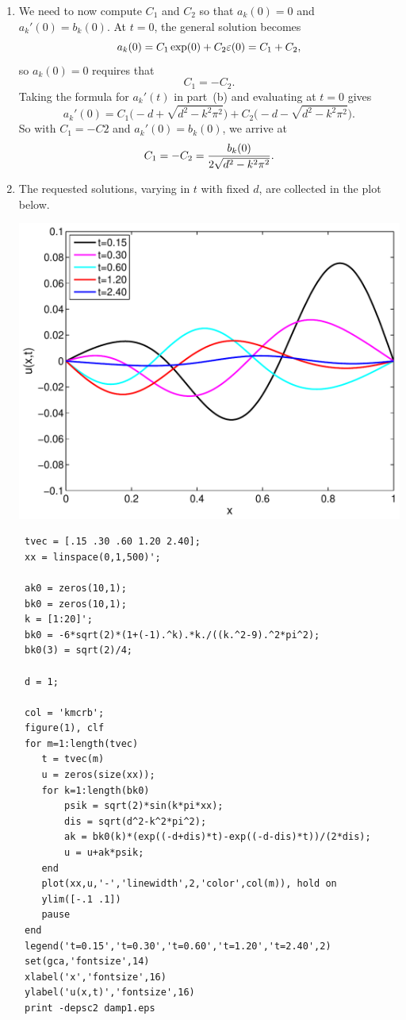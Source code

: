 \begin{solution}
\begin{enumerate}
\item We need to now compute $C_1$ and $C_2$ so that $a_k(0)=0$ and $a_k'(0)=b_k(0)$.
      At $t=0$, the general solution becomes
      \[ a_k(0) = C_1 \exp(0) + C_2 \varepsilon(0) = C_1 + C_2,\]
      so $a_k(0) = 0$ requires that 
           \[ C_1 = -C_2. \]
      Taking the formula for $a_k'(t)$ in part~(b) and evaluating at $t=0$ gives
      \[ a_k'(0) = C_1 \big(-d + \sqrt{d^2 -k^2\pi^2}\big)
                    + C_2 \big(-d - \sqrt{d^2 -k^2\pi^2}\big).\]
      So with $C_1 = -C2$ and $a_k'(0) = b_k(0)$, we arrive at
       \[ C_1 = -C_2 = {b_k(0) \over 2 \sqrt{d^2- k^2\pi^2}}.\]

\item The requested solutions, varying in $t$ with fixed $d$,
      are collected in the plot below.
     
      \begin{center} \includegraphics[scale=0.6]{damp1}\end{center}

{\small\begin{verbatim}
 tvec = [.15 .30 .60 1.20 2.40];
 xx = linspace(0,1,500)';

 ak0 = zeros(10,1);
 bk0 = zeros(10,1);
 k = [1:20]';
 bk0 = -6*sqrt(2)*(1+(-1).^k).*k./((k.^2-9).^2*pi^2);
 bk0(3) = sqrt(2)/4;

 d = 1;

 col = 'kmcrb';
 figure(1), clf
 for m=1:length(tvec)
    t = tvec(m)
    u = zeros(size(xx));
    for k=1:length(bk0)
        psik = sqrt(2)*sin(k*pi*xx);
        dis = sqrt(d^2-k^2*pi^2);
        ak = bk0(k)*(exp((-d+dis)*t)-exp((-d-dis)*t))/(2*dis);
        u = u+ak*psik;
    end 
    plot(xx,u,'-','linewidth',2,'color',col(m)), hold on
    ylim([-.1 .1])
    pause
 end
 legend('t=0.15','t=0.30','t=0.60','t=1.20','t=2.40',2)
 set(gca,'fontsize',14)
 xlabel('x','fontsize',16)
 ylabel('u(x,t)','fontsize',16)
 print -depsc2 damp1.eps
\end{verbatim}}


\end{enumerate}
\end{solution}
